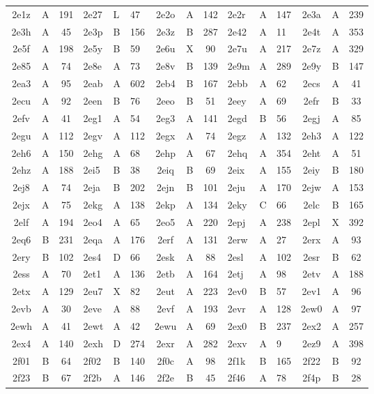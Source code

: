 \begin{longtable}{|c|c|c| a|a|a| c|c|c| a|a|a| c|c|c|}
2e1z & A & 191 & 2e27 & L & 47 & 2e2o & A & 142 & 2e2r & A & 147 & 2e3a & A & 239\\
2e3h & A & 45 & 2e3p & B & 156 & 2e3z & B & 287 & 2e42 & A & 11 & 2e4t & A & 353\\
2e5f & A & 198 & 2e5y & B & 59 & 2e6u & X & 90 & 2e7u & A & 217 & 2e7z & A & 329\\
2e85 & A & 74 & 2e8e & A & 73 & 2e8v & B & 139 & 2e9m & A & 289 & 2e9y & B & 147\\
2ea3 & A & 95 & 2eab & A & 602 & 2eb4 & B & 167 & 2ebb & A & 62 & 2ecs & A & 41\\
2ecu & A & 92 & 2een & B & 76 & 2eeo & B & 51 & 2eey & A & 69 & 2efr & B & 33\\
2efv & A & 41 & 2eg1 & A & 54 & 2eg3 & A & 141 & 2egd & B & 56 & 2egj & A & 85\\
2egu & A & 112 & 2egv & A & 112 & 2egx & A & 74 & 2egz & A & 132 & 2eh3 & A & 122\\
2eh6 & A & 150 & 2ehg & A & 68 & 2ehp & A & 67 & 2ehq & A & 354 & 2eht & A & 51\\
2ehz & A & 188 & 2ei5 & B & 38 & 2eiq & B & 69 & 2eix & A & 155 & 2eiy & B & 180\\
2ej8 & A & 74 & 2eja & B & 202 & 2ejn & B & 101 & 2eju & A & 170 & 2ejw & A & 153\\
2ejx & A & 75 & 2ekg & A & 138 & 2ekp & A & 134 & 2eky & C & 66 & 2elc & B & 165\\
2elf & A & 194 & 2eo4 & A & 65 & 2eo5 & A & 220 & 2epj & A & 238 & 2epl & X & 392\\
2eq6 & B & 231 & 2eqa & A & 176 & 2erf & A & 131 & 2erw & A & 27 & 2erx & A & 93\\
2ery & B & 102 & 2es4 & D & 66 & 2esk & A & 88 & 2esl & A & 102 & 2esr & B & 62\\
2ess & A & 70 & 2et1 & A & 136 & 2etb & A & 164 & 2etj & A & 98 & 2etv & A & 188\\
2etx & A & 129 & 2eu7 & X & 82 & 2eut & A & 223 & 2ev0 & B & 57 & 2ev1 & A & 96\\
2evb & A & 30 & 2eve & A & 88 & 2evf & A & 193 & 2evr & A & 128 & 2ew0 & A & 97\\
2ewh & A & 41 & 2ewt & A & 42 & 2ewu & A & 69 & 2ex0 & B & 237 & 2ex2 & A & 257\\
2ex4 & A & 140 & 2exh & D & 274 & 2exr & A & 282 & 2exv & A & 9 & 2ez9 & A & 398\\
2f01 & B & 64 & 2f02 & B & 140 & 2f0c & A & 98 & 2f1k & B & 165 & 2f22 & B & 92\\
2f23 & B & 67 & 2f2b & A & 146 & 2f2e & B & 45 & 2f46 & A & 78 & 2f4p & B & 28\\

\end{longtable}

